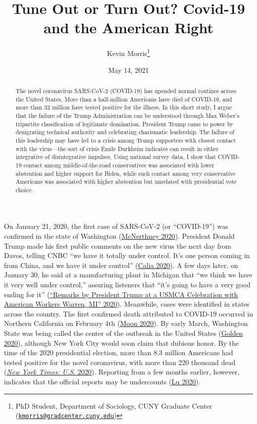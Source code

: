 \documentclass[
  12pt,
]{article}
\title{Tune Out or Turn Out? Covid-19 and the American Right}
\author{Kevin Morris\footnote{PhD Student, Department of Sociology, CUNY Graduate Center (\href{mailto:kmorris@gradcenter.cuny.edu}{\nolinkurl{kmorris@gradcenter.cuny.edu}})}}
\date{May 14, 2021}
\begin{document}
\maketitle
\begin{abstract}
The novel coronavirus SARS-CoV-2 (COVID-19) has upended normal routines across the United States. More than a half-million Americans have died of COVID-19, and more than 32 million have tested positive for the illness. In this short study, I argue that the failure of the Trump Administration can be understood through Max Weber's tripartite classification of legitimate domination. President Trump came to power by denigrating technical authority and celebrating charismatic leadership. The failure of this leadership may have led to a crisis among Trump supporters with closest contact with the virus---the sort of crisis Émile Durkheim indicates can result in either integrative of disintegrative impulses. Using national survey data, I show that COVID-19 contact among middle-of-the-road conservatives was associated with lower abstention and higher support for Biden, while such contact among very conservative Americans was associated with higher abstention but unrelated with presidential vote choice.
\end{abstract}

\pagebreak

\doublespacing

On January 21, 2020, the first case of SARS-CoV-2 (or ``COVID-19'') was confirmed in the state of Washington (\protect\hyperlink{ref-McNerthney2020}{McNerthney 2020}). President Donald Trump made his first public comments on the new virus the next day from Davos, telling CNBC ``we have it totally under control. It's one person coming in from China, and we have it under control'' (\protect\hyperlink{ref-Calia2020}{Calia 2020}). A few days later, on January 30, he said at a manufacturing plant in Michigan that ``we think we have it very well under control,'' assuring listeners that ``it's going to have a very good ending for it'' (\protect\hyperlink{ref-whitehouse2020}{{``Remarks by {President Trump} at a {USMCA Celebration} with {American Workers} \textbar{} {Warren}, {MI}''} 2020}). Meanwhile, cases were identified in states across the country. The first confirmed death attributed to COVID-19 occurred in Northern California on February 4th (\protect\hyperlink{ref-Moon2020}{Moon 2020}). By early March, Washington State was being called the center of the outbreak in the United States (\protect\hyperlink{ref-Golden2020}{Golden 2020}), although New York City would soon claim that dubious honor. By the time of the 2020 presidential election, more than 8.3 million Americans had tested positive for the novel coronavirus, with more than 220 thousand dead (\protect\hyperlink{ref-nyt2020}{\emph{New York Times: U.S.} 2020}). Reporting from a few months earlier, however, indicates that the official reports may be undercounts (\protect\hyperlink{ref-Lu2020}{Lu 2020}).
\end{document}
